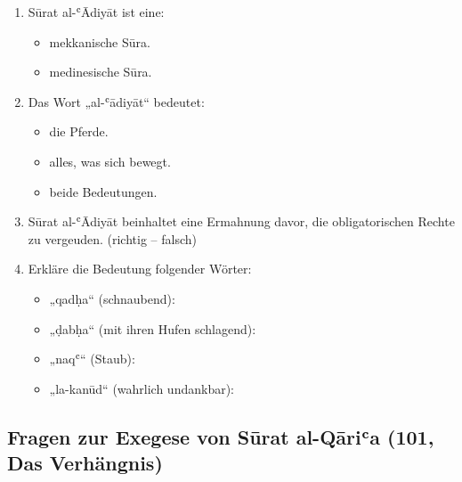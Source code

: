\begin{enumerate}[leftmargin=1.6em,resume]
\item Sūrat al-ʿĀdiyāt ist eine:
  \begin{itemize}
    \item mekkanische Sūra. \item medinesische Sūra.
  \end{itemize}
\item Das Wort „al-ʿādiyāt“ bedeutet:
  \begin{itemize}
    \item die Pferde. \item alles, was sich bewegt. \item beide Bedeutungen.
  \end{itemize}
\item Sūrat al-ʿĀdiyāt beinhaltet eine Ermahnung davor, die obligatorischen Rechte zu vergeuden.
  (richtig -- falsch)
\item Erkläre die Bedeutung folgender Wörter:
  \begin{itemize}
    \item „qadḥa“ (schnaubend): \dotfill
    \item „ḍabḥa“ (mit ihren Hufen schlagend): \dotfill
    \item „naqʿ“ (Staub): \dotfill
    \item „la-kanūd“ (wahrlich undankbar): \dotfill
  \end{itemize}
\end{enumerate}

\subsection*{Fragen zur Exegese von Sūrat al-Qāriʿa (101, Das Verhängnis)}

